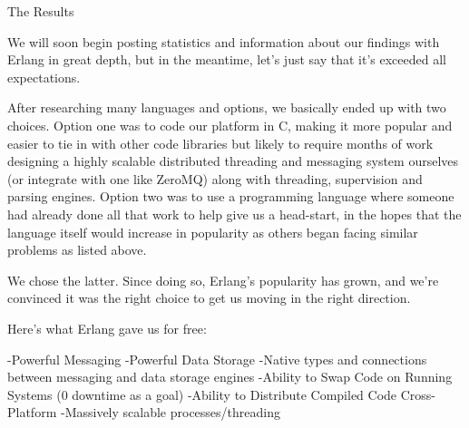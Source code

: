 The Results

We will soon begin posting statistics and information about our findings with Erlang in great depth, but in the meantime, let’s just say that it’s exceeded all expectations.  

After researching many languages and options, we basically ended up with two choices. Option one was to code our platform in C, making it more popular and easier to tie in with other code libraries but likely to require months of work designing a highly scalable distributed threading and messaging system ourselves (or integrate with one like ZeroMQ) along with threading, supervision and parsing engines. Option two was to use a programming language where someone had already done all that work to help give us a head-start, in the hopes that the language itself would increase in popularity as others began facing similar problems as listed above.

We chose the latter. Since doing so, Erlang’s popularity has grown, and we’re convinced it was the right choice to get us moving in the right direction. 

Here’s what Erlang gave us for free:

-Powerful Messaging
-Powerful Data Storage
-Native types and connections between messaging and data storage engines
-Ability to Swap Code on Running Systems (0 downtime as a goal)
-Ability to Distribute Compiled Code Cross-Platform
-Massively scalable processes/threading